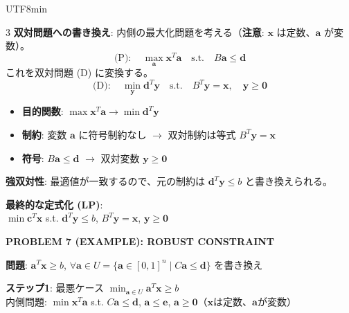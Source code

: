\documentclass[8pt,a4paper]{article}
\newcommand{\mysection}[1]{\vspace{2pt}\textbf{#1}\vspace{1pt}}
\begin{document}
\begin{CJK}{UTF8}{min}
\begin{multicols}{3}
\textbf{双対問題への書き換え}:
内側の最大化問題を考える（\textbf{注意}: $\boldsymbol{x}$ は定数、$\boldsymbol{a}$ が変数）。
\[
\text{(P)}: \quad \max_{\boldsymbol{a}} \boldsymbol{x}^T \boldsymbol{a} \quad \text{s.t.} \quad B\boldsymbol{a} \leq \boldsymbol{d}
\]
これを双対問題 (D) に変換する。
\[
\text{(D)}: \quad \min_{\boldsymbol{y}} \boldsymbol{d}^T \boldsymbol{y} \quad \text{s.t.} \quad B^T \boldsymbol{y} = \boldsymbol{x}, \quad \boldsymbol{y} \geq \mathbf{0}
\]
\begin{itemize}
    \item \textbf{目的関数}: $\max \boldsymbol{x}^T \boldsymbol{a} \to \min \boldsymbol{d}^T \boldsymbol{y}$
    \item \textbf{制約}: 変数 $\boldsymbol{a}$ に符号制約なし $\to$ 双対制約は等式 $B^T \boldsymbol{y} = \boldsymbol{x}$
    \item \textbf{符号}: $B\boldsymbol{a} \leq \boldsymbol{d}$ $\to$ 双対変数 $\boldsymbol{y} \geq \mathbf{0}$
\end{itemize}

\textbf{強双対性}: 最適値が一致するので、元の制約は $\boldsymbol{d}^T \boldsymbol{y} \leq b$ と書き換えられる。

\textbf{最終的な定式化 (LP)}:\\
$\min \boldsymbol{c}^T \boldsymbol{x}$ s.t. $\boldsymbol{d}^T \boldsymbol{y} \leq b$, $B^T \boldsymbol{y} = \boldsymbol{x}$, $\boldsymbol{y} \geq \mathbf{0}$

\mysection{PROBLEM 7 (EXAMPLE): ROBUST CONSTRAINT}

\textbf{問題}: $\boldsymbol{a}^T \boldsymbol{x} \geq b$, $\forall \boldsymbol{a} \in U = \{\boldsymbol{a} \in [0,1]^n \mid C\boldsymbol{a} \leq \boldsymbol{d}\}$ を書き換え

\textbf{ステップ1}: 最悪ケース $\min_{\boldsymbol{a} \in U} \boldsymbol{a}^T \boldsymbol{x} \geq b$\\
内側問題: $\min \boldsymbol{x}^T \boldsymbol{a}$ s.t. $C\boldsymbol{a} \leq \boldsymbol{d}$, $\boldsymbol{a} \leq \boldsymbol{e}$, $\boldsymbol{a} \geq \mathbf{0}$（$\boldsymbol{x}$は定数、$\boldsymbol{a}$が変数）


\end{multicols}
\end{CJK}
\end{document}
